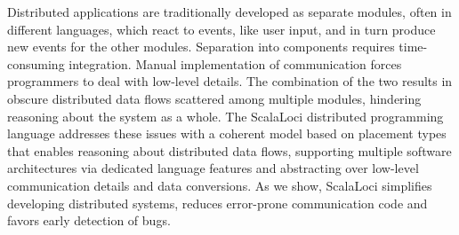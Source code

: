 Distributed applications are traditionally developed as separate modules, often in different languages, which react to events, like user input, and in turn produce new events for the other modules. Separation into components requires time-consuming integration. Manual implementation of communication forces programmers to deal with low-level details. The combination of the two results in obscure distributed data flows scattered among multiple modules, hindering reasoning about the system as a whole.
The ScalaLoci distributed programming language addresses these issues with a coherent model based on placement types that enables reasoning about distributed data flows, supporting multiple software architectures via dedicated language features and abstracting over low-level communication details and data conversions. As we show, ScalaLoci simplifies developing distributed systems, reduces error-prone communication code and favors early detection of bugs.
